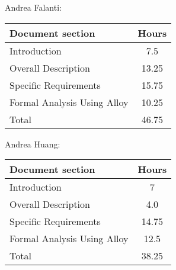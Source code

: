 Andrea Falanti:

\begin{tabular}{|l|c|}
    \hline
    Document section & Hours \\
    \hline
     Introduction & 7.5\\
     Overall Description & 13.25\\
     Specific Requirements & 15.75\\
     Formal Analysis Using Alloy & 10.25\\
     \hline
     Total & 46.75\\
     \hline
\end{tabular}
\vskip 0.3in

Andrea Huang:

\begin{tabular}{|l|c|}
    \hline
    Document section & Hours \\
    \hline
     Introduction &  7\\
     Overall Description & 4.0\\
     Specific Requirements & 14.75\\
     Formal Analysis Using Alloy & 12.5\\
     \hline
     Total & 38.25\\
     \hline
\end{tabular}